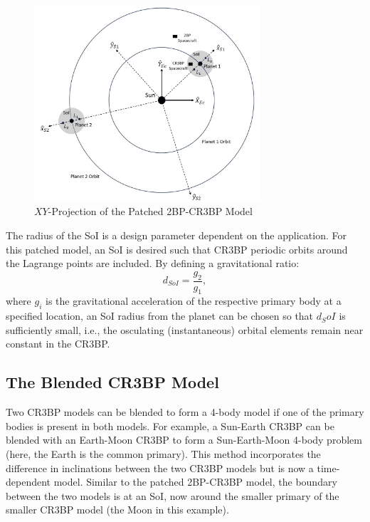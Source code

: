 \begin{figure}[ht]
    \centering
    \includegraphics[width=0.75\textwidth]{figures/TBP-CR3BP.jpg}
    \caption{$XY$-Projection of the Patched 2BP-CR3BP Model}
    \label{fig:2BP-CR3BP}
\end{figure}

The radius of the SoI is a design parameter dependent on the application. For this patched model,
an SoI is desired such that CR3BP periodic orbits around the Lagrange points are included. By
defining a gravitational ratio:
\begin{equation}
    d_{SoI}=\frac{g_{2}}{g_{1}},
    \label{eq:patchedSoI}
\end{equation}
where $g_{i}$ is the gravitational acceleration of the respective primary body at a specified
location, an SoI radius from the planet can be chosen so that $d_SoI$ is sufficiently small, i.e.,
the osculating (instantaneous) orbital elements remain near constant in the
CR3BP\cite{Canales:2021}.

\subsection{The Blended CR3BP Model}
Two CR3BP models can be blended to form a 4-body model if one of the primary bodies is present in
both models. For example, a Sun-Earth CR3BP can be blended with an Earth-Moon CR3BP to form a
Sun-Earth-Moon 4-body problem (here, the Earth is the common primary). This method incorporates the
difference in inclinations between the two CR3BP models but is now a time-dependent
model\cite{Kakoi:2014}. Similar to the patched 2BP-CR3BP model, the boundary between the two models
is at an SoI, now around the smaller primary of the smaller CR3BP model (the Moon in this example).

